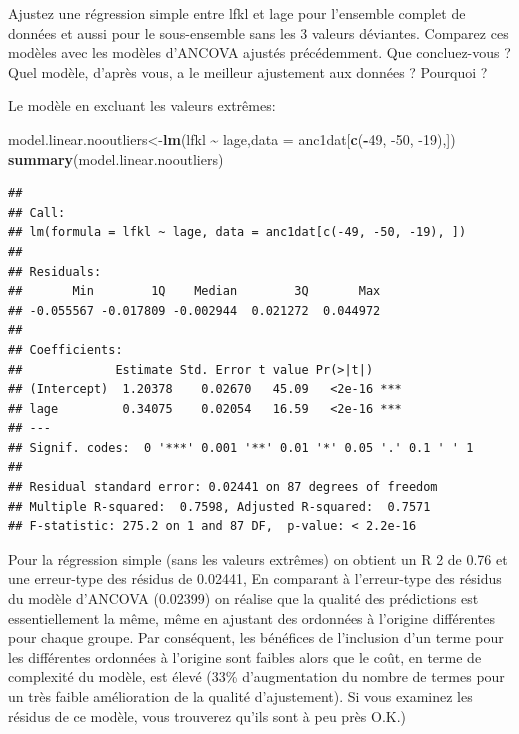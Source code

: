\documentclass[
  12pt,
]{book}
\makeatletter
\newenvironment{Shaded}{\begin{snugshade}}{\end{snugshade}}
\newcommand{\DataTypeTok}[1]{\textcolor[rgb]{0.13,0.29,0.53}{#1}}
\newcommand{\DecValTok}[1]{\textcolor[rgb]{0.00,0.00,0.81}{#1}}
\newcommand{\KeywordTok}[1]{\textcolor[rgb]{0.13,0.29,0.53}{\textbf{#1}}}
\newcommand{\NormalTok}[1]{#1}
\newcommand{\OperatorTok}[1]{\textcolor[rgb]{0.81,0.36,0.00}{\textbf{#1}}}
\newcommand{\StringTok}[1]{\textcolor[rgb]{0.31,0.60,0.02}{#1}}
\newenvironment{kframe}{%
\medskip{}
\setlength{\fboxsep}{.8em}
\def\at@end@of@kframe{}%
\ifinner\ifhmode%
 \def\at@end@of@kframe{\end{minipage}}%
 \begin{minipage}{\columnwidth}%
\fi\fi%
\def\FrameCommand##1{\hskip\@totalleftmargin \hskip-\fboxsep
\colorbox{incolor}{##1}\hskip-\fboxsep
    \hskip-\linewidth \hskip-\@totalleftmargin \hskip\columnwidth}%
\MakeFramed {\advance\hsize-\width
  \@totalleftmargin\z@ \linewidth\hsize
  \@setminipage}}%
{\par\unskip\endMakeFramed%
\at@end@of@kframe}
\newenvironment{rmdblock}[1]
 {
 \begin{itemize}
 \renewcommand{\labelitemi}{
   \raisebox{-.7\height}[0pt][0pt]{
     {\setkeys{Gin}{width=3em,keepaspectratio}\texttt{[image: images/\#1]}}
   }
 }
 \begin{kframe}
 \setlength{\fboxsep}{1em}
 \item
 }
 {
 \end{kframe}
 \end{itemize}
 }
\newenvironment{rmdcode}
  {\begin{rmdblock}{screen}}
  {\end{rmdblock}}
\makeatother
\begin{document}
\begin{rmdcode}
Ajustez une régression simple entre lfkl et lage pour l'ensemble complet de données et aussi pour le sous-ensemble sans les 3 valeurs déviantes. Comparez ces modèles avec les modèles d'ANCOVA ajustés précédemment. Que concluez-vous ? Quel modèle, d'après vous, a le meilleur ajustement aux données ? Pourquoi ?
\end{rmdcode}

Le modèle en excluant les valeurs extrêmes:

\begin{Shaded}
\begin{Highlighting}[]
\NormalTok{model.linear.nooutliers\textless{}{-}}\KeywordTok{lm}\NormalTok{(lfkl }\OperatorTok{\textasciitilde{}}\StringTok{ }\NormalTok{lage,}\DataTypeTok{data =}\NormalTok{ anc1dat[}\KeywordTok{c}\NormalTok{(}\OperatorTok{{-}}\DecValTok{49}\NormalTok{, }\DecValTok{{-}50}\NormalTok{, }\DecValTok{{-}19}\NormalTok{),])}
\KeywordTok{summary}\NormalTok{(model.linear.nooutliers)}
\end{Highlighting}
\end{Shaded}

\begin{verbatim}
## 
## Call:
## lm(formula = lfkl ~ lage, data = anc1dat[c(-49, -50, -19), ])
## 
## Residuals:
##       Min        1Q    Median        3Q       Max 
## -0.055567 -0.017809 -0.002944  0.021272  0.044972 
## 
## Coefficients:
##             Estimate Std. Error t value Pr(>|t|)    
## (Intercept)  1.20378    0.02670   45.09   <2e-16 ***
## lage         0.34075    0.02054   16.59   <2e-16 ***
## ---
## Signif. codes:  0 '***' 0.001 '**' 0.01 '*' 0.05 '.' 0.1 ' ' 1
## 
## Residual standard error: 0.02441 on 87 degrees of freedom
## Multiple R-squared:  0.7598, Adjusted R-squared:  0.7571 
## F-statistic: 275.2 on 1 and 87 DF,  p-value: < 2.2e-16
\end{verbatim}

Pour la régression simple (sans les valeurs extrêmes) on obtient un R 2 de 0.76 et une erreur-type des résidus de 0.02441, En comparant à l'erreur-type des résidus du modèle d'ANCOVA (0.02399) on réalise que la qualité des prédictions est essentiellement la même, même en ajustant des ordonnées à l'origine différentes pour chaque groupe. Par conséquent, les bénéfices de l'inclusion d'un terme pour les différentes ordonnées à l'origine sont faibles alors que le coût, en terme de complexité du modèle, est élevé (33\% d'augmentation du nombre de termes pour un très faible amélioration de la qualité d'ajustement). Si vous examinez les résidus de ce modèle, vous trouverez qu'ils sont à peu près O.K.)
\end{document}
